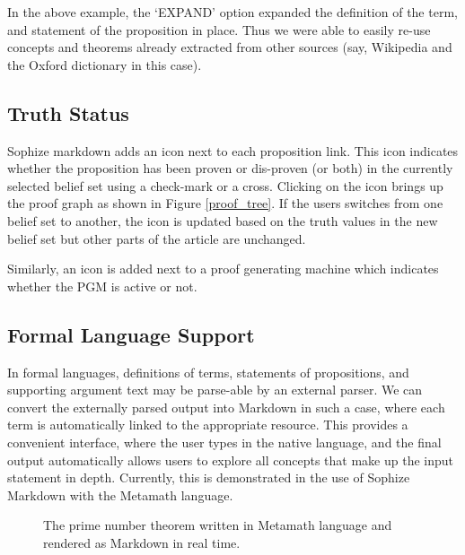 \documentclass[a4paper]{article}
\begin{document}
In the above example, the `EXPAND' option expanded the definition of the term, and statement of the proposition in place. Thus we were able to easily re-use concepts and theorems already extracted from other sources (say, Wikipedia and the Oxford dictionary in this case).

\subsection{Truth Status}

Sophize markdown adds an icon next to each proposition link. This icon indicates whether the proposition has been proven or dis-proven (or both) in the currently selected belief set using a check-mark or a cross. Clicking on the icon brings up the proof graph as shown in Figure \ref{proof_tree}. If the users switches from one belief set to another, the icon is updated based on the truth values in the new belief set but other parts of the article are unchanged.

Similarly, an icon is added next to a proof generating machine which indicates whether the PGM is active or not.

\subsection{Formal Language Support}

In formal languages, definitions of terms, statements of propositions, and supporting argument text may be parse-able by an external parser. We can convert the externally parsed output into Markdown in such a case, where each term is automatically linked to the appropriate resource. This provides a convenient interface, where the user types in the native language, and the final output automatically allows users to explore all concepts that make up the input statement in depth. Currently, this is demonstrated in the use of Sophize Markdown with the Metamath language.

\begin{figure}[htbp]
\begin{center}
\caption{The prime number theorem written in Metamath language and rendered as Markdown in real time.}
\label{formal}
\end{center}
\end{figure}
\end{document}
